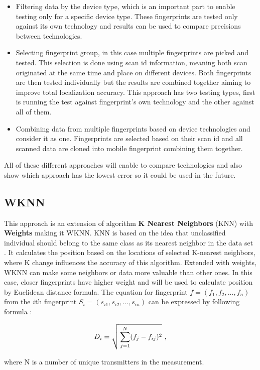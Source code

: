 \begin{itemize}
	\item Filtering data by the device type, which is an important part to enable testing only for a specific device type. These fingerprints are tested only against its own technology and results can be used to compare precisions between technologies.
	\item Selecting fingerprint group, in this case multiple fingerprints are picked and tested. This selection is done using scan id information, meaning both scan originated at the same time and place on different devices. Both fingerprints are then tested individually but the results are combined together aiming to improve total localization accuracy. This approach has two testing types, first is running the test against fingerprint's own technology and the other against all of them.
	\item Combining data from multiple fingerprints based on device technologies and consider it as one. Fingerprints are selected based on their scan id and all scanned data are cloned into mobile fingerprint combining them together.
\end{itemize}

All of these different approaches will enable to compare technologies and also show which approach has the lowest error so it could be used in the future. 

\subsection{WKNN}\label{sec:WKNN}
This approach is an extension of algorithm \textbf{K Nearest Neighbors} (KNN) with \textbf{Weights} making it WKNN. KNN is based on the idea that unclassified individual should belong to the same class as its nearest neighbor in the data set \cite{HGAfC}. It calculates the position based on the locations of selected K-nearest neighbors, where K change influences the accuracy of this algorithm. Extended with weights, WKNN can make some neighbors or data more valuable than other ones. In this case, closer fingerprints have higher weight and will be used to calculate position by Euclidean distance formula. The equation for fingerprint $f = (f_1,f_2,...,f_n)$ from the $i$th fingerprint $S_i = (s_{i1} ,s_{i2},...,s_{in})$ can be expressed by following formula \cite{IILUBLEB, HGAfC}:

$$D_i = \sqrt{\strut\sum_{j=1}^{N}(f_j-f_{ij})^2}\ ,$$

where N is a number of unique transmitters in the measurement.

